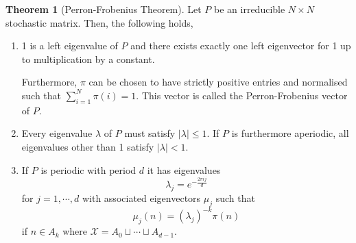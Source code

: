 \documentclass[]{article}
\theoremstyle{definition}
\newtheorem{theorem}{Theorem}
\theoremstyle{definition}
\begin{document}
\begin{theorem}[Perron-Frobenius Theorem]
  Let \(P\) be an irreducible \(N \times N\) stochastic matrix. Then, the following 
  holds,
  \begin{enumerate}
    \item 1 is a left eigenvalue of \(P\) and there exists exactly 
      one left eigenvector for 1 up to multiplication by a constant.

      Furthermore, \(\pi\) can be chosen to have strictly positive entries 
      and normalised such that \(\sum_{i = 1}^N \pi(i) = 1\). This vector 
      is called the Perron-Frobenius vector of \(P\).
    \item Every eigenvalue \(\lambda\) of \(P\) must satisfy \(|\lambda| \le 1\). If \(P\) is 
      furthermore aperiodic, all eigenvalues other than 1 satisfy \(|\lambda| < 1\).
    \item If \(P\) is periodic with period \(d\) it has eigenvalues
      \[\lambda_j = e^{-\frac{2\pi i j}{d}}\]
      for \(j = 1, \cdots, d\) with associated eigenvectors \(\mu_j\) such that 
      \[\mu_j(n) = (\lambda_j)^{-k} \pi(n)\]
      if \(n \in A_k\) where \(\mathcal{X} = A_0 \sqcup \cdots \sqcup A_{d - 1}\).
  \end{enumerate}
\end{theorem}
\end{document}
